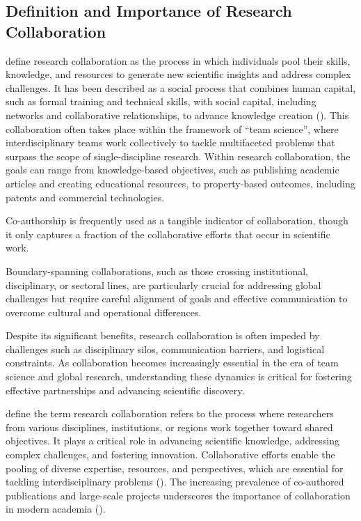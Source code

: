 \subsection*{Definition and Importance of Research Collaboration}
\cite{Bozeman2014} define research collaboration as the process in which individuals pool their skills, knowledge, and resources to generate new scientific insights and address complex challenges.
It has been described as a social process that combines human capital, such as formal training and technical skills, with social capital, including networks and collaborative relationships, to advance knowledge creation (\cite{Bozeman2014}).
This collaboration often takes place within the framework of ``team science'', where interdisciplinary teams work collectively to tackle multifaceted problems that surpass the scope of single-discipline research.
Within research collaboration, the goals can range from knowledge-based objectives, such as publishing academic articles and creating educational resources, to property-based outcomes, including patents and commercial technologies.

Co-authorship is frequently used as a tangible indicator of collaboration, though it only captures a fraction of the collaborative efforts that occur in scientific work.

Boundary-spanning collaborations, such as those crossing institutional, disciplinary, or sectoral lines, are particularly crucial for addressing global challenges but require careful alignment of goals and effective communication to overcome cultural and operational differences.

Despite its significant benefits, research collaboration is often impeded by challenges such as disciplinary silos, communication barriers, and logistical constraints.
As collaboration becomes increasingly essential in the era of team science and global research, understanding these dynamics is critical for fostering effective partnerships and advancing scientific discovery.

\cite{KATZ19971} define the term research collaboration refers to the process where researchers from various disciplines, institutions, or regions work together toward shared objectives.
It plays a critical role in advancing scientific knowledge, addressing complex challenges, and fostering innovation.
Collaborative efforts enable the pooling of diverse expertise, resources, and perspectives, which are essential for tackling interdisciplinary problems (\cite{KATZ19971}).
The increasing prevalence of co-authored publications and large-scale projects underscores the importance of collaboration in modern academia (\cite{Adams2012}).

